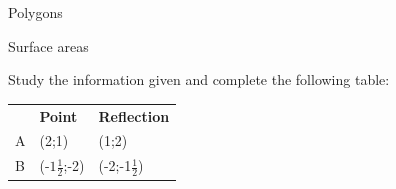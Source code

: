 \begin{exercises}{Polygons}
\begin{exercises}{Surface areas }
\begin{figure}[H]
 \end{figure}   

    \addtocounter{footnote}{-0}
    
          \par 
          \label{m39358*id71863}Study the information given and complete the following table:\par 
          
    
          \begin{table}[H]
        
    
        \begin{center}
      
      \label{m39358*id71867}
      
    \noindent
      \tablelasttail{}
      \begin{xtabular}[t]{|l|l|l|}\hline
    
    
         &
    
    
        
                    \textbf{Point}
                   &
    
    
        
                    \textbf{Reflection}
     \tabularnewline{}
    
    
        A &
    
    
        (2;1) &
    
    
        (1;2)%
     \tabularnewline{}
    
    
        B &
    
    
        (-$1\frac{1}{2}$;-2) &
    
    
        (-2;-1$\frac{1}{2}$)%
     \tabularnewline{}
    

\end{xtabular}
\end{center}
\end{table}
\end{exercises}
\end{exercises}
